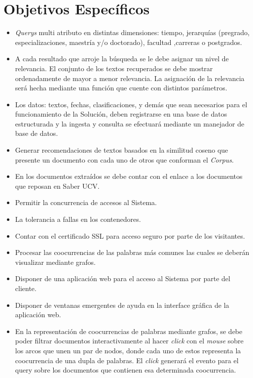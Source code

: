 \documentclass[
  10,
  openany]{book}
\begin{document}
\hypertarget{objetivosespe}{%
\section{Objetivos Específicos}\label{objetivosespe}}

\begin{itemize}
\item
  \emph{Querys} multi atributo en distintas dimensiones: tiempo, jerarquías (pregrado, especializaciones, maestría y/o doctorado), facultad ,carreras o postgrados.
\item
  A cada resultado que arroje la búsqueda se le debe asignar un nivel de relevancia. El conjunto de los textos recuperados se debe mostrar ordenadamente de mayor a menor relevancia. La asignación de la relevancia será hecha mediante una función que cuente con distintos parámetros.
\item
  Los datos: textos, fechas, clasificaciones, y demás que sean necesarios para el funcionamiento de la Solución, deben registrarse en una base de datos estructurada y la ingesta y consulta se efectuará mediante un manejador de base de datos.
\item
  Generar recomendaciones de textos basados en la similitud coseno que presente un documento con cada uno de otros que conforman el \emph{Corpus}.
\item
  En los documentos extraídos se debe contar con el enlace a los documentos que reposan en Saber UCV.
\item
  Permitir la concurrencia de accesos al Sistema.
\item
  La tolerancia a fallas en los contenedores.
\item
  Contar con el certificado SSL para acceso seguro por parte de los visitantes.
\item
  Procesar las coocurrencias de las palabras más comunes las cuales se deberán visualizar mediante grafos.
\item
  Disponer de una aplicación web para el acceso al Sistema por parte del cliente.
\item
  Disponer de ventanas emergentes de ayuda en la interface gráfica de la aplicación web.
\item
  En la representación de coocurrencias de palabras mediante grafos, se debe poder filtrar documentos interactivamente al hacer \emph{click} con el \emph{mouse} sobre los arcos que unen un par de nodos, donde cada uno de estos representa la coocurrencia de una dupla de palabras. El \emph{click} generará el evento para el query sobre los documentos que contienen esa determinada coocurrencia.
\end{itemize}
\end{document}
